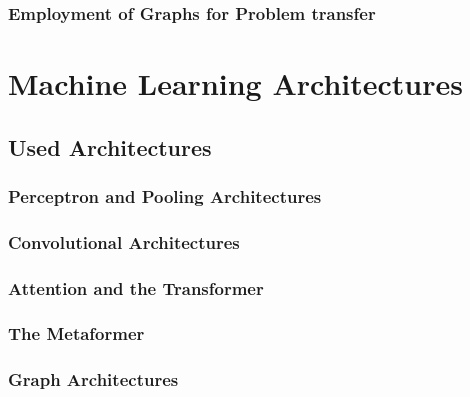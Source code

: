 \documentclass[
headings=optiontohead,              %
12pt,                               %
DIV=13,                             %
twoside=false,                      %
open=right,                         %
BCOR=10mm,                          %
toc=bibliographynumbered            %
]{scrreport}
\begin{document}
        \subsection{Employment of Graphs for Problem transfer}
        \label{sec:theory-graphs}
        
        \FloatBarrier

\chapter{Machine Learning Architectures}
\label{sec:architectures}

    \section{Used Architectures}
    \label{sec:architectures-theory}
    
        \subsection{Perceptron and Pooling Architectures}
        \label{sec:architectures-perceptron-pooling}
        
        \FloatBarrier
        \subsection{Convolutional Architectures}
        \label{sec:architectures-convolution}
        
        \FloatBarrier
        \subsection{Attention and the Transformer}
        \label{sec:architectures-attention}
        
        \FloatBarrier
        \subsection{The Metaformer}
        \label{sec:architectures-metaformer}
        
        \FloatBarrier
        \subsection{Graph Architectures}
        \label{sec:architectures-graphs}
        
        \FloatBarrier
\end{document}
